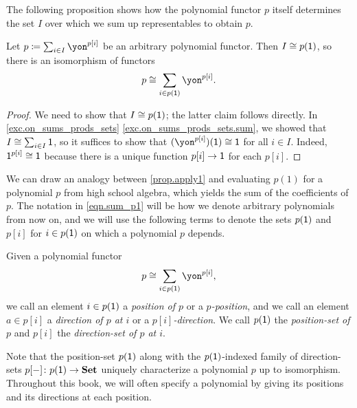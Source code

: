 \documentclass[Book-Poly]{subfiles}
\begin{document}
The following proposition shows how the polynomial functor $p$ itself determines the set $I$ over which we sum up representables to obtain $p$.

\begin{proposition}\label{prop.apply1}
    Let $p\coloneqq\sum_{i\in I}\yon^{p[i]}$ be an arbitrary polynomial functor. Then $I\cong p(\textsf{1})$, so there is an isomorphism of functors
    \begin{equation}\label{eqn.sum_p1}
        p\iso\sum_{i\in p(\1)}\yon^{p[i]}.
    \end{equation}
\end{proposition}
\begin{proof}
    We need to show that $I\cong p(\textsf{1})$; the latter claim follows directly.
    In \cref{exc.on_sums_prods_sets} \cref{exc.on_sums_prods_sets.sum}, we showed that $I\cong\sum_{i\in I}\textsf{1}$, so it suffices to show that $(\yon^{p[i]})(\1)\iso\1$ for all $i \in I$.
    Indeed, $\textsf{1}^{p[i]}\cong \textsf{1}$ because there is a unique function $p[i]\to \textsf{1}$ for each $p[i]$.
\end{proof}
We can draw an analogy between \cref{prop.apply1} and evaluating $p(1)$ for a polynomial $p$ from high school algebra, which yields the sum of the coefficients of $p$.
The notation in \eqref{eqn.sum_p1} will be how we denote arbitrary polynomials from now on, and we will use the following terms to denote the sets $p(\textsf{1})$ and $p[i]$ for $i\in p(\textsf{1})$ on which a polynomial $p$ depends.

\begin{definition}
    Given a polynomial functor
    \[
    p\iso\sum_{i\in p(\1)}\yon^{p[i]},
    \]
    we call an element $i\in p(\textsf{1})$ a \emph{position of $p$} or a \emph{$p$-position}, and we call an element $a\in p[i]$ a \emph{direction of $p$ at $i$} or a \emph{$p[i]$-direction}.
    We call $p(\textsf{1})$ the \emph{position-set of $p$} and $p[i]$ the \emph{direction-set of $p$ at $i$}.
\end{definition}

Note that the position-set $p(\textsf{1})$ along with the $p(\textsf{1})$-indexed family of direction-sets $p[-]\colon p(\textsf{1})\to\mathbf{Set}$ uniquely characterize a polynomial $p$ up to isomorphism.
Throughout this book, we will often specify a polynomial by giving its positions and its directions at each position.
\end{document}
